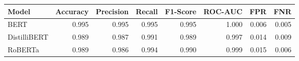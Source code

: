 \begin{tabular}{|l||r|r|r|r|r|r|r|}
\toprule
Model & \textbf{Accuracy} & \textbf{Precision} & Recall & \textbf{F1-Score} & \textbf{ROC-AUC} & \textbf{FPR} & FNR \\
\midrule \midrule
BERT & 0.995 & 0.995 & 0.995 & 0.995 & 1.000 & 0.006 & 0.005 \\
DistilliBERT & 0.989 & 0.987 & 0.991 & 0.989 & 0.997 & 0.014 & 0.009 \\
RoBERTa & 0.989 & 0.986 & 0.994 & 0.990 & 0.999 & 0.015 & 0.006 \\
\bottomrule
\end{tabular}
